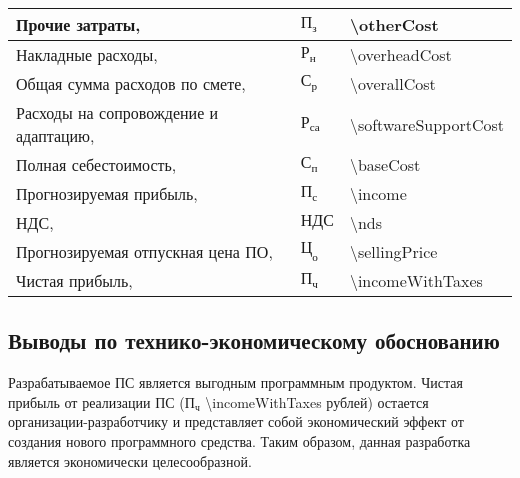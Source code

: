 \begin{table}[!ht]
\begin{tabular}{| >{\raggedright}m{}
                  | >{\centering}m{}
                  | >{\centering\arraybackslash}m{}|}
    \hline
    Прочие затраты, \byr{} & $ \text{П}_\text{з} $ & \num{\otherCost} \\

    \hline
    Накладные расходы, \byr{} & $ \text{Р}_\text{н} $ & \num{\overheadCost} \\

    \hline
    Общая сумма расходов по смете, \byr{} & $ \text{С}_\text{р} $ & \num{\overallCost} \\

    \hline
    Расходы на сопровождение и адаптацию, \byr{} & $ \text{Р}_\text{са} $ & \num{\softwareSupportCost} \\

    \hline
    Полная себестоимость, \byr{} & $ \text{С}_\text{п} $ & \num{\baseCost} \\

    \hline
    Прогнозируемая прибыль, \byr{} & $ \text{П}_\text{с} $ & \num{\income} \\

    \hline
    НДС, \byr{} & $ \text{НДС} $ & \num{\nds} \\

    \hline
    Прогнозируемая отпускная цена ПО, \byr{} & $ \text{Ц}_\text{о} $ & \num{\sellingPrice} \\

    \hline
    Чистая прибыль, \byr{} & $ \text{П}_\text{ч} $ & \num{\incomeWithTaxes} \\

    \hline
  \end{tabular}
\end{table}

\subsection{Выводы по технико-экономическому обоснованию}
Разрабатываемое ПС является выгодным программным продуктом. Чистая прибыль от реализации ПС ($ \text{П}_\text{ч} $ \num{\incomeWithTaxes} рублей) остается организации-разработчику и представляет собой экономический эффект от создания нового программного средства.
Таким образом, данная разработка является экономически целесообразной.

\hfill
\clearpage
